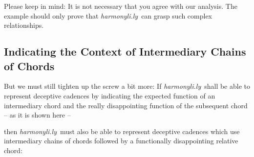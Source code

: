 \documentclass[
  DIV=calc,
  BCOR=5mm,
  12pt,
  headings=small,
  oneside,
  abstract=true,
  toc=bib,
  xcolor=dvipsnames,
  openany,
  english]{scrartcl}
\newcommand{\hlyn}[0]{\textit{harmonyli.ly}}
\begin{document}
Please keep in mind: It is not necessary that you agree with our analysis. The
example should only prove that \hlyn\ can grasp such complex relationships.

\subsection{Indicating the Context of Intermediary Chains of Chords}

But we must still tighten up the screw a bit more: If \hlyn\ shall be able to
represent deceptive cadences by indicating the expected function of an
intermediary chord and the really disappointing function of the subsequent chord
-- as it is shown here --

\begin{center}
\end{center}

then \hlyn\  must also be able to represent deceptive cadences which use
intermediary chains of chords followed by a functionally disappointing relative
chord:

\begin{center}
\end{center}
\end{document}
